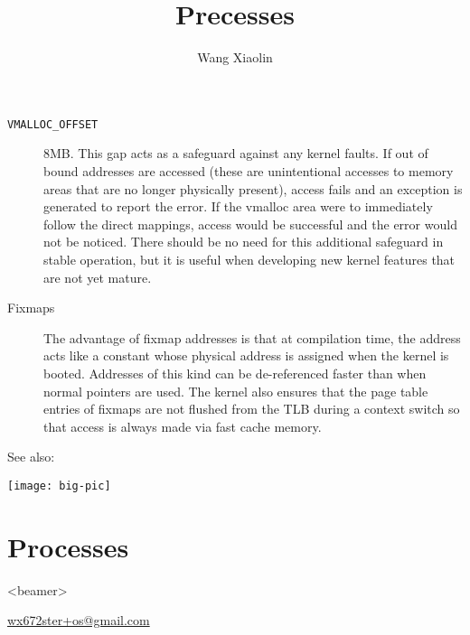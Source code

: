 \begin{description}
\item[\texttt{VMALLOC\_OFFSET}] 8MB. This gap acts as a safeguard against any kernel
  faults. If out of bound addresses are accessed (these are unintentional accesses to
  memory areas that are no longer physically present), access fails and an exception is
  generated to report the error. If the vmalloc area were to immediately follow the direct
  mappings, access would be successful and the error would not be noticed. There should be
  no need for this additional safeguard in stable operation, but it is useful when
  developing new kernel features that are not yet mature. 
\item[Fixmaps] The advantage of fixmap addresses is that at compilation
  time, the address acts like a constant whose physical address is assigned when the
  kernel is booted. Addresses of this kind can be de-referenced faster than when normal
  pointers are used. The kernel also ensures that the page table entries of fixmaps are
  not flushed from the TLB during a context switch so that access is always made via fast
  cache memory. 
\end{description}

See also: 



\begin{center}
  \texttt{[image: big-pic]}
\end{center}


\section{Processes}

\begin{frame}<beamer>
  \title{Precesses}
  \author{Wang Xiaolin}
  \titlepage
  \vfill
  {\small{} \url{wx672ster+os@gmail.com} }
\end{frame}

